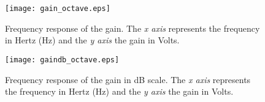\begin{figure}[H] \centering
	\texttt{[image: gain\_octave.eps]}
	\caption{Frequency response of the gain. The \textit{x axis} represents the frequency in Hertz (Hz) and the \textit{y axis} the gain in Volts.}
	\label{fig:teo_gain}
\end{figure}

\begin{figure}[H] \centering
	\texttt{[image: gaindb\_octave.eps]}
	\caption {Frequency response of the gain in dB scale. The \textit{x axis} represents the frequency in Hertz (Hz) and the \textit{y axis} the gain in Volts.}
	\label{fig:teo_gaindB}
\end{figure}
